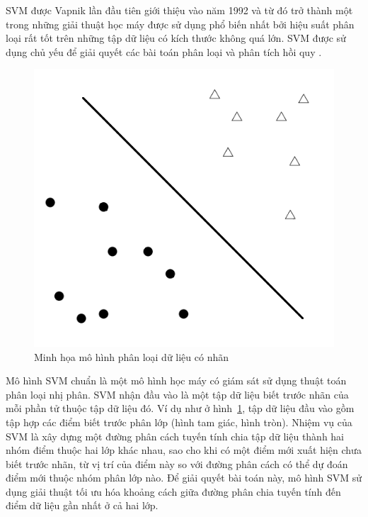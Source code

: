 SVM được Vapnik lần đầu tiên giới thiệu vào năm 1992 và từ đó trở thành một trong những giải thuật học máy được sử dụng phổ biến nhất bởi hiệu suất phân loại rất tốt trên những tập dữ liệu có kích thước không quá lớn. SVM được sử dụng chủ yếu để giải quyết các bài toán phân loại và phân tích hồi quy \cite{chandrakala2012opinion}\cite{manning2009anintroduction}. \\

\begin{figure}[h]
\centering
\includegraphics[scale=0.5]{hinh/SVM1.png}
\caption{Minh họa mô hình phân loại dữ liệu có nhãn}
\label{fig:dataclassify}
\end{figure}
\pagebreak
Mô hình SVM chuẩn là một mô hình học máy có giám sát sử dụng thuật toán phân loại nhị phân. SVM nhận đầu vào là một tập dữ liệu biết trước nhãn của mỗi phần tử thuộc tập dữ liệu đó. Ví dụ như ở hình~\ref{fig:dataclassify}, tập dữ liệu đầu vào gồm tập hợp các điểm biết trước phân lớp (hình tam giác, hình tròn). Nhiệm vụ của SVM là xây dựng một đường phân cách tuyến tính chia tập dữ liệu thành hai nhóm điểm thuộc hai lớp khác nhau, sao cho khi có một điểm mới xuất hiện chưa biết trước nhãn, từ vị trí của điểm này so với đường phân cách có thể dự đoán điểm mới thuộc nhóm phân lớp nào. Để giải quyết bài toán này, mô hình SVM sử dụng giải thuật tối ưu hóa khoảng cách giữa đường phân chia tuyến tính đến điểm dữ liệu gần nhất ở cả hai lớp.
